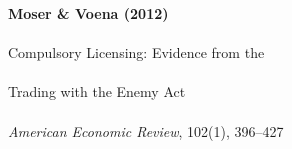 \documentclass[12pt]{article}
\begin{document}
\begin{center}
{\Large\bfseries Moser \& Voena (2012)}\\\\
{\large Compulsory Licensing: Evidence from the}\\\\
{\large Trading with the Enemy Act}\\\\
\vspace{0.5em}
{\normalsize \textit{American Economic Review}, 102(1), 396--427}
\end{center}

\vspace{1em}




\end{document}
